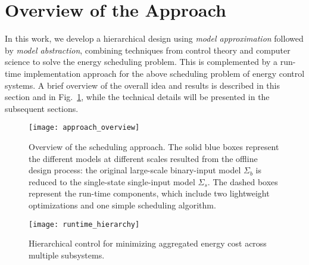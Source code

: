 \section{Overview of the Approach}
\label{sec:overview}

In this work, we develop a hierarchical design using \emph{model approximation} followed by \emph{model abstraction}, combining techniques from control theory and computer science to solve the energy scheduling problem. %
This is complemented by a run-time implementation approach for the above scheduling problem of energy control systems.
A brief overview of the overall idea and results is described in this section and in Fig.~\ref{fig:overview}, while the technical details will be presented in the subsequent sections.

\begin{figure}[tb]
  \centering
  \texttt{[image: approach\_overview]}
 \vspace{-6pt}
  \caption{Overview of the scheduling approach. The solid blue boxes represent the different models at different scales resulted from the offline design process: the original large-scale binary-input model $\Sigma_{b}$ is reduced to the single-state single-input model $\Sigma_{s}$.  The dashed boxes represent the run-time components, which include two lightweight optimizations and one simple scheduling algorithm.}
  \vspace{-10pt}
  \label{fig:overview}
\end{figure}

\begin{figure}[tb]
  \centering
  \texttt{[image: runtime\_hierarchy]}
  \caption{Hierarchical control for minimizing aggregated energy cost across multiple subsystems.}%
    \vspace{-10pt}
  \label{fig:runtime-hierarchy}
\end{figure}

